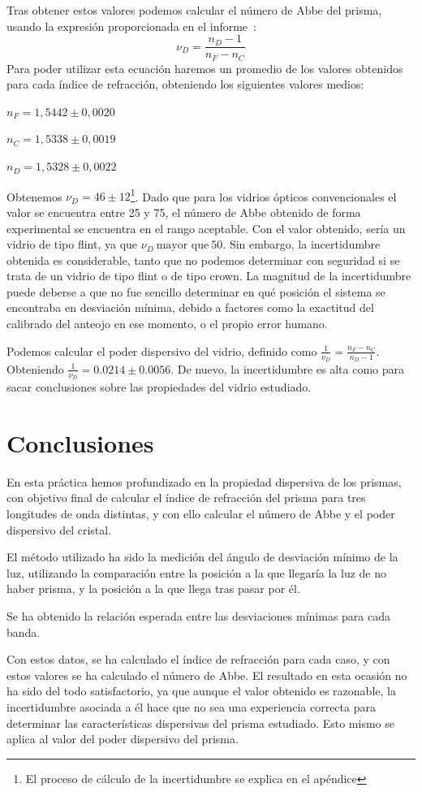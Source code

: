 \documentclass[10pt,onecolumn]{article}
\begin{document}
Tras obtener estos valores podemos calcular el número de Abbe del prisma, usando la expresión proporcionada en el informe~\cite{InfoOpticaPrisma}:
 \[
\nu_D = \frac{n_D - 1}{n_F - n_C}
\]
Para poder utilizar esta ecuación haremos un promedio de los valores obtenidos para cada 
índice de refracción, obteniendo los siguientes valores medios:

$n_F = 1,5442\pm 0,0020$	

$n_C = 1,5338\pm 0,0019$	

$n_D = 1,5328\pm 0,0022$

Obtenemos $\nu_D=46\pm12$\footnote{El proceso de cálculo de la incertidumbre se explica en el apéndice}. 
Dado que para los vidrios ópticos convencionales el valor se encuentra entre 25 y 75,
el número de Abbe obtenido de forma experimental 
se encuentra en el rango aceptable. Con el valor obtenido, sería un vidrio de tipo flint, ya que $\nu_D\ \text{mayor que}\ 50$.
Sin embargo, la incertidumbre obtenida es considerable, tanto que no podemos determinar con seguridad si
se trata de un vidrio de tipo flint o de tipo crown.
La magnitud de la incertidumbre puede deberse a que no fue sencillo determinar en qué posición el sistema 
se encontraba en desviación mínima, debido a factores como la exactitud del calibrado del anteojo en ese 
momento, o el propio error humano.


Podemos calcular el poder dispersivo del vidrio, definido como $\frac{1}{\nu_D} = \frac{n_F - n_C}{n_D - 1}$. 
Obteniendo $\frac{1}{\nu_D}=0.0214\pm 0.0056$. De nuevo, la incertidumbre es alta como para 
sacar conclusiones sobre las propiedades del vidrio estudiado.

\section{Conclusiones}
En esta práctica hemos profundizado en la propiedad dispersiva de los prismas, con objetivo 
final de calcular el índice de refracción del prisma para tres longitudes de onda distintas, 
y con ello calcular el número de Abbe y el poder dispersivo del cristal.

El método utilizado ha sido la medición del ángulo de desviación mínimo de la luz, 
utilizando la comparación entre la posición a la que llegaría la luz de no haber prisma, 
y la posición a la que llega tras pasar por él.

Se ha obtenido la relación esperada entre las desviaciones mínimas para cada banda.

Con estos datos, se ha calculado el índice de refracción para cada caso, y con estos valores se ha calculado 
el número de Abbe. El resultado en esta ocasión no ha sido del todo satisfactorio, ya que aunque el 
valor obtenido es razonable, la incertidumbre asociada a él hace que no sea una experiencia correcta 
para determinar las características dispersivas del prisma estudiado. Esto mismo se aplica al valor del 
poder dispersivo del prisma.
\end{document}
